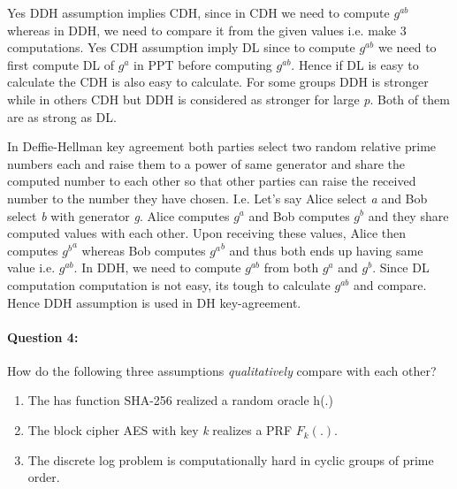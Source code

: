 \documentclass{article}
\begin{document}
        Yes DDH assumption implies CDH, since in CDH we need to compute $g^{ab}$ whereas in DDH, we need to compare it from the given values i.e. make 3 computations. Yes CDH assumption imply DL since to compute $g^{ab}$ we need to first compute DL of $g^a$ in PPT before computing $g^{ab}$. Hence if DL is easy to calculate the CDH is also easy to calculate.\newline
        For some groups DDH is stronger while in others CDH but DDH is considered as stronger for large \emph{p}. Both of them are as strong as DL. \newline
        
        In Deffie-Hellman key agreement both parties select two random relative prime numbers each and raise them to a power of same generator and share the computed number to each other so that other parties can raise the received number to the number they have chosen. I.e. Let's say Alice select \emph{a} and Bob select \emph{b} with generator \emph{g}. Alice computes $g^a$ and Bob computes $g^b$ and they share computed values with each other. Upon receiving these values, Alice then computes ${g^b}^a$ whereas Bob computes ${g^a}^b$ and thus both ends up having same value i.e. $g^{ab}$. In DDH, we need to compute $g^{ab}$ from both $g^{a}$ and $g^{b}$. Since DL computation computation is not easy, its tough to calculate $g^{ab}$ and compare. Hence DDH assumption is used in DH key-agreement.
        
    \paragraph{Question 4:} How do the following three assumptions \emph{qualitatively} compare with each other?
    \begin{enumerate}
        \item The has function SHA-256 realized a random oracle h(.)
        \item The block cipher AES with key \emph{k} realizes a PRF $F_k(.)$.
        \item The discrete log problem is computationally hard in cyclic groups of prime order.
    \end{enumerate}
\end{document}
